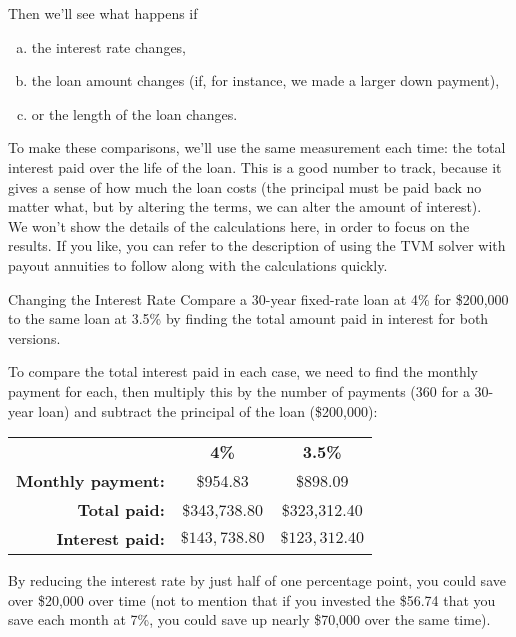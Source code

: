 Then we'll see what happens if 
\begin{enumerate}[(a)]
\item the interest rate changes,
\item the loan amount changes (if, for instance, we made a larger down payment),
\item or the length of the loan changes.
\end{enumerate}

To make these comparisons, we'll use the same measurement each time: the total interest paid over the life of the loan.  This is a good number to track, because it gives a sense of how much the loan costs (the principal must be paid back no matter what, but by altering the terms, we can alter the amount of interest).\\

We won't show the details of the calculations here, in order to focus on the results.  If you like, you can refer to the description of using the TVM solver with payout annuities to follow along with the calculations quickly.

\begin{example}[https://www.youtube.com/watch?v=lonOnaBf3TA&list=PLfmpjsIzhztsZtnb7HnXrQ8SLoiOCIcAM&index=38]{Changing the Interest Rate}
Compare a 30-year fixed-rate loan at 4\% for \$200,000 to the same loan at 3.5\% by finding the total amount paid in interest for both versions.

\sol
To compare the total interest paid in each case, we need to find the monthly payment for each, then multiply this by the number of payments (360 for a 30-year loan) and subtract the principal of the loan (\$200,000):
\begin{center}
\begin{tabular}{r c c}
& \textbf{4\%} & \textbf{3.5\%}\\
\textbf{Monthly payment:} & \$954.83 & \$898.09\\
\textbf{Total paid:} & \$343,738.80 & \$323,312.40\\
\textbf{Interest paid:} & $\boxed{\$143,738.80}$ & $\boxed{\$123,312.40}$
\end{tabular}
\end{center}

By reducing the interest rate by just half of one percentage point, you could save over \$20,000 over time (not to mention that if you invested the \$56.74 that you save each month at 7\%, you could save up nearly \$70,000 over the same time).
\end{example}

